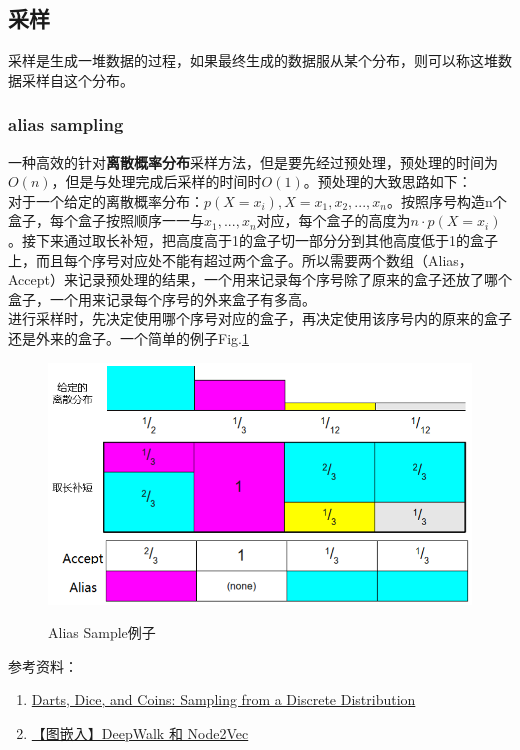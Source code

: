 \subsection{采样}
采样是生成一堆数据的过程，如果最终生成的数据服从某个分布，则可以称这堆数据采样自这个分布。
\subsubsection{alias sampling }
一种高效的针对\textbf{离散概率分布}采样方法，但是要先经过预处理，预处理的时间为$O(n)$，但是与处理完成后采样的时间时$O(1)$。预处理的大致思路如下：\\
对于一个给定的离散概率分布：$p(X = x_i) , X = x_1, x_2, ..., x_n$。按照序号构造n个盒子，每个盒子按照顺序一一与$x_1, ..., x_n$对应，每个盒子的高度为$n \cdot p(X = x_i)$。接下来通过取长补短，把高度高于1的盒子切一部分分到其他高度低于1的盒子上，而且每个序号对应处不能有超过两个盒子。所以需要两个数组（Alias，Accept）来记录预处理的结果，一个用来记录每个序号除了原来的盒子还放了哪个盒子，一个用来记录每个序号的外来盒子有多高。\\
进行采样时，先决定使用哪个序号对应的盒子，再决定使用该序号内的原来的盒子还是外来的盒子。一个简单的例子Fig.\ref{fig:alias-sample}
\begin{figure}[h]
	\centering
	\includegraphics[width=.8\textwidth]{pics/alias-sample.png}
	\label{fig:alias-sample}
	\caption{Alias Sample例子}
\end{figure}


参考资料：
\begin{enumerate}
    \item \href{https://www.keithschwarz.com/darts-dice-coins/}{Darts, Dice, and Coins: Sampling from a Discrete Distribution}
    \item \href{https://www.cnblogs.com/dogecheng/p/13198198.html}{【图嵌入】DeepWalk 和 Node2Vec}
\end{enumerate}

